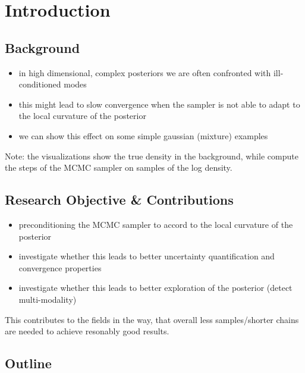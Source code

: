 \section{Introduction}\label{chap:introduction}

\subsection{Background}

\begin{itemize}
    \item in high dimensional, complex posteriors we are often confronted with
          ill-conditioned modes
    \item this might lead to slow convergence when the sampler is not able to adapt to
          the local curvature of the posterior
    \item we can show this effect on some simple gaussian (mixture) examples
\end{itemize}

Note: the visualizations show the true density in the background, while compute
the steps of the MCMC sampler on samples of the log density.

\subsection{Research Objective \& Contributions}

\begin{itemize}
    \item preconditioning the MCMC sampler to accord to the local curvature of the
          posterior
    \item investigate whether this leads to better uncertainty quantification and
          convergence properties
    \item investigate whether this leads to better exploration of the posterior (detect
          multi-modality)
\end{itemize}

This contributes to the fields in the way, that overall less samples/shorter
chains are needed to achieve resonably good results.

\subsection{Outline}


\newpage
